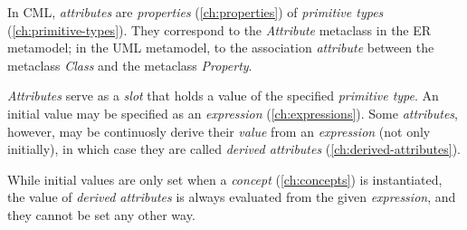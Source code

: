 In CML, \emph{attributes} are \emph{properties} (\ref{ch:properties})
of \emph{primitive types} (\ref{ch:primitive-types}).
They correspond to the \emph{Attribute} metaclass
in the ER \cite{er} metamodel;
in the UML \cite{uml} metamodel,
to the association \emph{attribute} between the metaclass \emph{Class}
and the metaclass \emph{Property}.

\emph{Attributes} serve as a \emph{slot} that holds a value of
the specified \emph{primitive type}.
An initial value may be specified as an \emph{expression} (\ref{ch:expressions}).
Some \emph{attributes}, however, may be continuosly
derive their \emph{value} from an \emph{expression} (not only initially),
in which case they are called \emph{derived attributes} (\ref{ch:derived-attributes}).

While initial values are only set when a \emph{concept} (\ref{ch:concepts})
is instantiated,
the value of \emph{derived attributes} is always evaluated
from the given \emph{expression},
and they cannot be set any other way.

